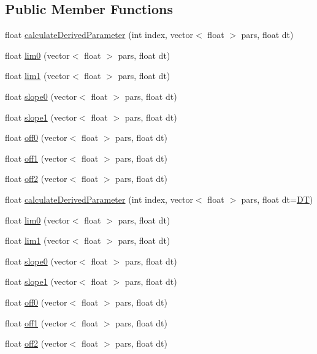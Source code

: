 \subsection*{Public Member Functions}
\begin{DoxyCompactItemize}
\item 
float \hyperlink{classpwSTDP_a6c0e3e483e484f8805edd58b7fb37507}{calculate\+Derived\+Parameter} (int index, vector$<$ float $>$ pars, float dt)
\item 
float \hyperlink{classpwSTDP_a996a53e179ac03e2f4865f85befad83a}{lim0} (vector$<$ float $>$ pars, float dt)
\item 
float \hyperlink{classpwSTDP_ae9755a1032792e651f9e93954fe85bb5}{lim1} (vector$<$ float $>$ pars, float dt)
\item 
float \hyperlink{classpwSTDP_a133f3a6b781d34b20be1eb951117e9f5}{slope0} (vector$<$ float $>$ pars, float dt)
\item 
float \hyperlink{classpwSTDP_a2ddfab4a97982618adc2f706e2d58aeb}{slope1} (vector$<$ float $>$ pars, float dt)
\item 
float \hyperlink{classpwSTDP_a488fa77803291d76e4e5e62766afb087}{off0} (vector$<$ float $>$ pars, float dt)
\item 
float \hyperlink{classpwSTDP_a97f72c888ee9384dd28beb7f551fcb0e}{off1} (vector$<$ float $>$ pars, float dt)
\item 
float \hyperlink{classpwSTDP_aa019d5962f48763e9468f081d6c5c1f7}{off2} (vector$<$ float $>$ pars, float dt)
\item 
float \hyperlink{classpwSTDP_a29af7a11b93e3617d9da090cc07ad578}{calculate\+Derived\+Parameter} (int index, vector$<$ float $>$ pars, float dt=\hyperlink{SynDelaySim_8h_a943f07034774ef1261d62cd0d3d1fec9}{D\+T})
\item 
float \hyperlink{classpwSTDP_a996a53e179ac03e2f4865f85befad83a}{lim0} (vector$<$ float $>$ pars, float dt)
\item 
float \hyperlink{classpwSTDP_ae9755a1032792e651f9e93954fe85bb5}{lim1} (vector$<$ float $>$ pars, float dt)
\item 
float \hyperlink{classpwSTDP_a133f3a6b781d34b20be1eb951117e9f5}{slope0} (vector$<$ float $>$ pars, float dt)
\item 
float \hyperlink{classpwSTDP_a2ddfab4a97982618adc2f706e2d58aeb}{slope1} (vector$<$ float $>$ pars, float dt)
\item 
float \hyperlink{classpwSTDP_a488fa77803291d76e4e5e62766afb087}{off0} (vector$<$ float $>$ pars, float dt)
\item 
float \hyperlink{classpwSTDP_a97f72c888ee9384dd28beb7f551fcb0e}{off1} (vector$<$ float $>$ pars, float dt)
\item 
float \hyperlink{classpwSTDP_aa019d5962f48763e9468f081d6c5c1f7}{off2} (vector$<$ float $>$ pars, float dt)
\end{DoxyCompactItemize}


